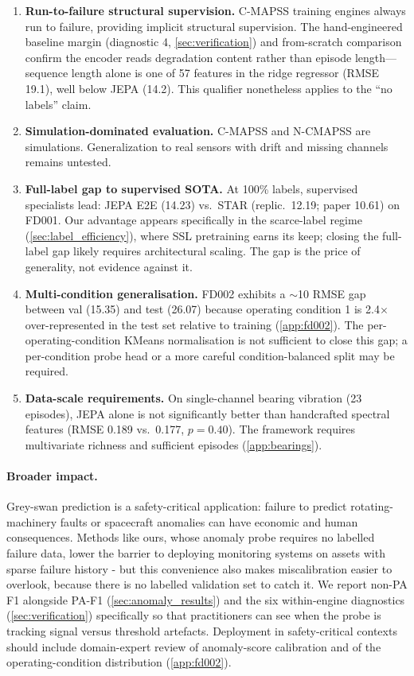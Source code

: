 \documentclass{article}
\begin{document}
\begin{enumerate}[nosep]
  \item \textbf{Run-to-failure structural supervision.} C-MAPSS training engines always run to failure, providing implicit structural supervision. The hand-engineered baseline margin (diagnostic 4, \cref{sec:verification}) and from-scratch comparison confirm the encoder reads degradation content rather than episode length---sequence length alone is one of 57 features in the ridge regressor (RMSE 19.1), well below JEPA (14.2). This qualifier nonetheless applies to the ``no labels'' claim.
  \item \textbf{Simulation-dominated evaluation.} C-MAPSS and N-CMAPSS are simulations. Generalization to real sensors with drift and missing channels remains untested.
  \item \textbf{Full-label gap to supervised SOTA.} At 100\% labels, supervised specialists lead: JEPA E2E (14.23) vs.\ STAR (replic.\ 12.19; paper 10.61) on FD001. Our advantage appears specifically in the scarce-label regime (\cref{sec:label_efficiency}), where SSL pretraining earns its keep; closing the full-label gap likely requires architectural scaling. The gap is the price of generality, not evidence against it.
  \item \textbf{Multi-condition generalisation.} FD002 exhibits a $\sim$10 RMSE gap between val (15.35) and test (26.07) because operating condition 1 is 2.4$\times$ over-represented in the test set relative to training (\cref{app:fd002}). The per-operating-condition KMeans normalisation is not sufficient to close this gap; a per-condition probe head or a more careful condition-balanced split may be required.
  \item \textbf{Data-scale requirements.} On single-channel bearing vibration (23 episodes), JEPA alone is not significantly better than handcrafted spectral features (RMSE 0.189 vs.\ 0.177, $p = 0.40$). The framework requires multivariate richness and sufficient episodes (\cref{app:bearings}).
\end{enumerate}

\paragraph{Broader impact.}
Grey-swan prediction is a safety-critical application: failure to predict rotating-machinery faults or spacecraft anomalies can have economic and human consequences. Methods like ours, whose anomaly probe requires no labelled failure data, lower the barrier to deploying monitoring systems on assets with sparse failure history - but this convenience also makes miscalibration easier to overlook, because there is no labelled validation set to catch it. We report non-PA F1 alongside PA-F1 (\cref{sec:anomaly_results}) and the six within-engine diagnostics (\cref{sec:verification}) specifically so that practitioners can see when the probe is tracking signal versus threshold artefacts. Deployment in safety-critical contexts should include domain-expert review of anomaly-score calibration and of the operating-condition distribution (\cref{app:fd002}).
\end{document}
